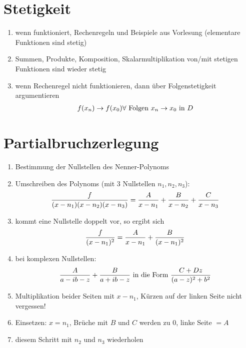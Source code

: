 \documentclass[ngerman,a4paper]{article}
\begin{document}
\section{Stetigkeit}
\begin{enumerate}[label=\textbf{\arabic*.}]
	\item wenn funktioniert, Rechenregeln und Beispiele aus Vorlesung (elementare Funktionen sind stetig)
	\item Summen, Produkte, Komposition, Skalarmultiplikation von/mit stetigen Funktionen sind wieder stetig
	\item wenn Rechenregel nicht funktionieren, dann über Folgenstetigkeit argumentieren
	\begin{align}
		f(x_n) \to f(x_0) \forall \text{ Folgen } x_n \to x_0 \text{ in } D\notag
	\end{align}
\end{enumerate}

\section{Partialbruchzerlegung}
\begin{enumerate}[label=\textbf{\arabic*.}]
	\item Bestimmung der Nullstellen des Nenner-Polynoms
	\item Umschreiben des Polynoms (mit 3 Nullstellen $n_1,n_2,n_3$):
	\begin{align}
		\frac{f}{(x-n_1)(x-n_2)(x-n_3)}=\frac{A}{x-n_1}+\frac{B}{x-n_2}+\frac{C}{x-n_3}\notag
	\end{align}
	\item kommt eine Nullstelle doppelt vor, so ergibt sich
	\begin{align}
		\frac{f}{(x-n_1)^2}=\frac{A}{x-n_1}+\frac{B}{(x-n_1)^2}\notag
	\end{align}
	\item bei komplexen Nullstellen:
	\begin{align}
		\frac{A}{a-ib-z}+\frac{B}{a+ib-z} \text{ in die Form } \frac{C+Dz}{(a-z)^2+b^2}\notag
	\end{align}
	\item Multiplikation beider Seiten mit $x-n_1$, Kürzen auf der linken Seite nicht vergessen!
	\item Einsetzen: $x=n_1$, Brüche mit $B$ und $C$ werden zu 0, linke Seite $= A$
	\item diesem Schritt mit $n_2$ und $n_3$ wiederholen
\end{enumerate}
\end{document}
